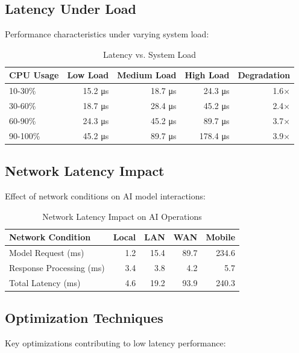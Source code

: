 \subsection*{Latency Under Load}

Performance characteristics under varying system load:

\begin{table}[ht]
\centering
\caption{Latency vs. System Load}
\label{tab:latency-load}
\begin{tabular}{@{}lrrrr@{}}
\toprule
\textbf{CPU Usage} & \textbf{Low Load} & \textbf{Medium Load} & \textbf{High Load} & \textbf{Degradation} \\
\midrule
10-30\% & 15.2 μs & 18.7 μs & 24.3 μs & 1.6× \\
30-60\% & 18.7 μs & 28.4 μs & 45.2 μs & 2.4× \\
60-90\% & 24.3 μs & 45.2 μs & 89.7 μs & 3.7× \\
90-100\% & 45.2 μs & 89.7 μs & 178.4 μs & 3.9× \\
\bottomrule
\end{tabular}
\end{table}

\subsection*{Network Latency Impact}

Effect of network conditions on AI model interactions:

\begin{table}[ht]
\centering
\caption{Network Latency Impact on AI Operations}
\label{tab:network-latency}
\begin{tabular}{@{}lrrrr@{}}
\toprule
\textbf{Network Condition} & \textbf{Local} & \textbf{LAN} & \textbf{WAN} & \textbf{Mobile} \\
\midrule
Model Request (ms) & 1.2 & 15.4 & 89.7 & 234.6 \\
Response Processing (ms) & 3.4 & 3.8 & 4.2 & 5.7 \\
Total Latency (ms) & 4.6 & 19.2 & 93.9 & 240.3 \\
\bottomrule
\end{tabular}
\end{table}

\subsection*{Optimization Techniques}

Key optimizations contributing to low latency performance:

